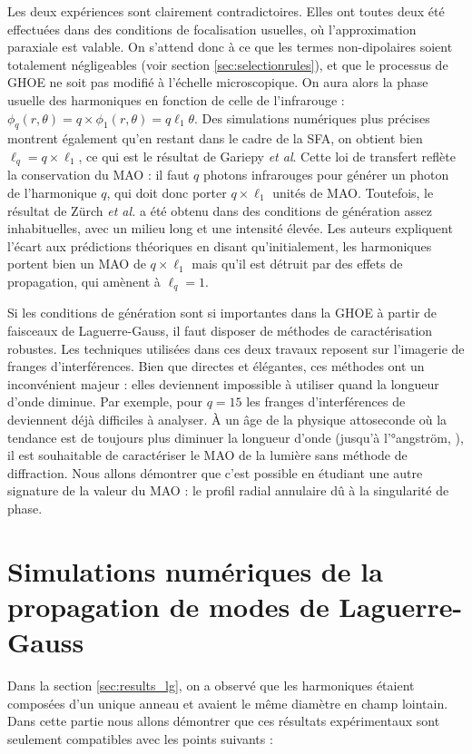 Les deux expériences sont clairement contradictoires. Elles ont toutes deux été effectuées dans des conditions de focalisation usuelles, où l'approximation paraxiale est valable. On s'attend donc à ce que les termes non-dipolaires soient totalement négligeables (voir section \ref{sec:selectionrules}), et que le processus de GHOE ne soit pas modifié à l'échelle microscopique. On aura alors la phase usuelle des harmoniques en fonction de celle de l'infrarouge : $\phi_q(r,\theta) = q\times\phi_1(r,\theta) = q\ell_1\theta$. Des simulations numériques plus précises  montrent également qu'en restant dans le cadre de la SFA, on obtient bien $\ell_{q}=q\times\ell_1$, ce qui est le résultat de Gariepy \textit{et al}. Cette loi de transfert reflète la conservation du MAO : il faut $q$ photons infrarouges pour générer un photon de l'harmonique $q$, qui doit donc porter $q\times\ell_1$ unités de MAO.
Toutefois, le résultat de Zürch \textit{et al.} a été obtenu dans des conditions de génération assez inhabituelles, avec un milieu long et une intensité élevée. Les auteurs expliquent l'écart aux prédictions théoriques en disant qu'initialement, les harmoniques portent bien un MAO de $q\times\ell_1$ mais qu'il est détruit par des effets de propagation, qui amènent à $\ell_q = 1$.

Si les conditions de génération sont si importantes dans la GHOE à partir de faisceaux de Laguerre-Gauss, il faut disposer de méthodes de caractérisation robustes. Les techniques utilisées dans ces deux travaux reposent sur l'imagerie de franges d'interférences. Bien que directes et élégantes, ces méthodes ont un inconvénient majeur : elles deviennent impossible à utiliser quand la longueur d'onde diminue. Par exemple, pour $q=15$ les franges d'interférences de  deviennent déjà difficiles à analyser. \`{A} un âge de la physique attoseconde où la tendance est de toujours plus diminuer la longueur d'onde (jusqu'à l'°angström, ), il est souhaitable de caractériser le MAO de la lumière sans méthode de diffraction. Nous allons démontrer que c'est possible en étudiant une autre signature de la valeur du MAO : le profil radial annulaire dû à la singularité de phase.

\section{Simulations numériques de la propagation de modes de Laguerre-Gauss}
Dans la section \ref{sec:results_lg}, on a observé que les harmoniques étaient composées d'un unique anneau et avaient le même diamètre en champ lointain. Dans cette partie nous allons démontrer que ces résultats expérimentaux sont seulement compatibles avec les points suivants :


